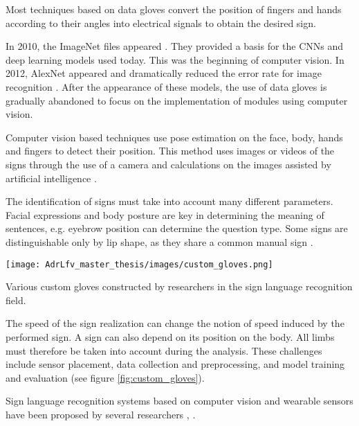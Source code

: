 Most techniques based on data gloves convert the position of fingers and hands according to their angles into electrical signals to obtain the desired sign. 

In 2010, the ImageNet files appeared \cite{li2010crowdsourcing}. They provided a basis for the CNNs and deep learning models used today. This was the beginning of computer vision. In 2012, AlexNet appeared and dramatically reduced the error rate for image recognition \cite{alom2018history}. After the appearance of these models, the use of data gloves is gradually abandoned to focus on the implementation of modules using computer vision.

Computer vision based techniques use pose estimation on the face, body, hands and fingers to detect their position. This method uses images or videos of the signs through the use of a camera and calculations on the images assisted by artificial intelligence \cite{adeyanju2021machine}. 

The identification of signs must take into account many different parameters. Facial expressions and body posture are key in determining the meaning of sentences, e.g. eyebrow position can determine the question type. Some signs are distinguishable only by lip shape, as they share a common manual sign \cite{cooper2011sign}. 


\begin{marginfigure}
    \centering
    
    \texttt{[image: AdrLfv\_master\_thesis/images/custom\_gloves.png]}
    \caption{Various custom gloves constructed by researchers in the sign language recognition field.}
    \label{fig:custom_gloves}
\end{marginfigure}

The speed of the sign realization can change the notion of speed induced by the performed sign. A sign can also depend on its position on the body. All limbs must therefore be taken into account during the analysis. These challenges include sensor placement, data collection and preprocessing, and model training and evaluation \cite{9178440} (see figure \ref{fig:custom_gloves}).

Sign language recognition systems based on computer vision and wearable sensors have been proposed by several researchers \cite{ionescu2005dynamic} \cite{yu2010vision} \cite{li2015feature} \cite{sonkusare2015review} \cite{bobic2016hand} \cite{islam2017real} \cite{islam2017real} \cite{saha2018machine}, \cite{rastgoo2021hand} \cite{xu2021application}. 

